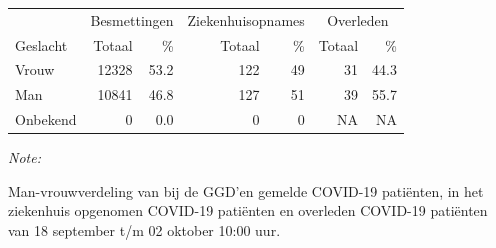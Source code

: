 \documentclass[
  english,
  man,floatsintext]{apa6}
\begin{document}
\begin{table}
\centering\begingroup\fontsize{11}{13}\selectfont

\begin{threeparttable}
\begin{tabular}{lrrrrrr}
\toprule
\multicolumn{1}{c}{ } & \multicolumn{2}{c}{Besmettingen} & \multicolumn{2}{c}{Ziekenhuisopnames} & \multicolumn{2}{c}{Overleden} \\
\cmidrule(l{3pt}r{3pt}){2-3} \cmidrule(l{3pt}r{3pt}){4-5} \cmidrule(l{3pt}r{3pt}){6-7}
Geslacht & Totaal & \% & Totaal & \% & Totaal & \%\\
\midrule
Vrouw & 12328 & 53.2 & 122 & 49 & 31 & 44.3\\
Man & 10841 & 46.8 & 127 & 51 & 39 & 55.7\\
Onbekend & 0 & 0.0 & 0 & 0 & NA & NA\\
\bottomrule
\end{tabular}
\begin{tablenotes}
\item \textit{Note: } 
\item Man-vrouwverdeling van bij de GGD’en gemelde COVID-19 patiënten, in het ziekenhuis opgenomen COVID-19 patiënten en overleden COVID-19 patiënten van 18 september t/m 02 oktober 10:00 uur.
\end{tablenotes}
\end{threeparttable}
\endgroup{}
\end{table}
\newpage
\end{document}
